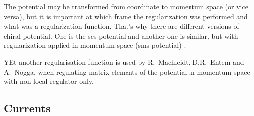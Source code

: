 The potential may be transformed from coordinate to momentum space (or vice versa),
but it is important at which frame the regularization was performed
and what was a regularization function. That's why there are different 
versions of chiral potential. One is the \gls{scs} potential \cite{Epelbaum2014SCS}
and another one is similar, but with regularization applied in momentum space (\gls{sms} potential) \cite{reinkrebs2018}.

YEt another regularisation function  is used by R.~Machleidt, D.R.~Entem and A.~Nogga, 
when regulating matrix elements of the potential in momentum space with non-local regulator only.

\subsection*{Currents}
 

